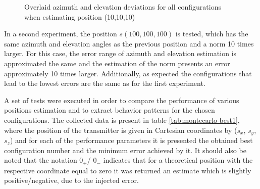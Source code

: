 \begin{figure}[!htbp]
	\captionsetup{justification=centering,margin=2cm}
	\caption{Overlaid azimuth and elevation deviations for all configurations when estimating position (10,10,10)}
	\label{fig:both-101010}
\end{figure}

In a second experiment, the position $s(100,100,100)$ is tested, which has the same azimuth and elevation angles as the previous position and a norm 10 times larger. For this case, the error range of azimuth and elevation estimation is approximated the same and the estimation of the norm presents an error approximately 10 times larger. Additionally, as expected the configurations that lead to the lowest errors are the same as for the first experiment.

A set of tests were executed in order to compare the performance of various positions estimation and to extract behavior patterns for the chosen configurations. The collected data is present in table \ref{tab:montecarlo-best1}, where the position of the transmitter is given in Cartesian coordinates by ($s_x$, $s_y$, $s_z$) and for each of the performance parameters it is presented the obtained best configuration number and the minimum error achieved by it. It should also be noted that the notation $0_{+}$/ $0_{-}$ indicates that for a theoretical position with the respective coordinate equal to zero it was returned an estimate which is slightly positive/negative, due to the injected error.


